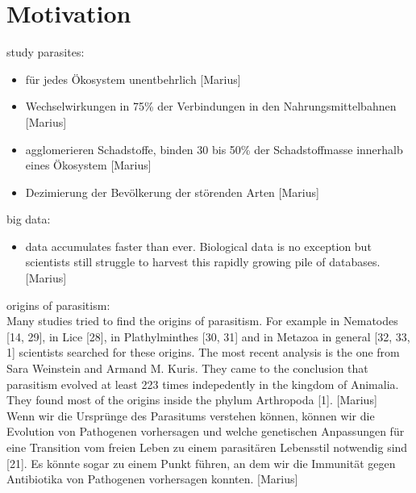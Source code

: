   \section{Motivation}
    study parasites:
    \begin{itemize}
      \item für jedes Ökosystem unentbehrlich [Marius]
      \item Wechselwirkungen in 75\% der Verbindungen in den Nahrungsmittelbahnen [Marius]
      \item agglomerieren Schadstoffe, binden 30 bis 50\% der Schadstoffmasse innerhalb eines Ökosystem [Marius]
      \item Dezimierung der Bevölkerung der störenden Arten [Marius]
    \end{itemize}
    big data:
    \begin{itemize}
      \item data accumulates faster than ever. Biological data is no exception but scientists still struggle to harvest this rapidly growing pile of databases. [Marius]      
    \end{itemize}
    origins of parasitism: \\
    Many studies tried to find the origins of parasitism. For example in Nematodes [14, 29], in Lice 
      [28], in Plathylminthes [30, 31] and in Metazoa in general [32, 33, 1] scientists searched for 
      these origins. The most recent analysis is the one from Sara Weinstein and Armand M. Kuris. 
      They came to the conclusion that parasitism evolved at least 223 times indepedently in the 
      kingdom of Animalia. They found most of the origins inside the phylum Arthropoda [1]. [Marius] \\
    Wenn wir die Ursprünge des Parasitums verstehen können, können wir die Evolution von Pathogenen 
      vorhersagen und welche genetischen Anpassungen für eine Transition vom freien Leben zu einem 
      parasitären Lebensstil notwendig sind [21]. Es könnte sogar zu einem Punkt führen, an dem wir 
      die Immunität gegen Antibiotika von Pathogenen vorhersagen konnten. [Marius]


